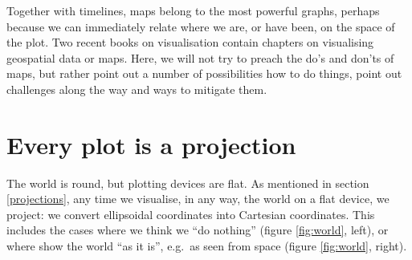 \documentclass[]{book}
\begin{document}
Together with timelines, maps belong to the most powerful graphs,
perhaps because we can immediately relate where we are, or have
been, on the space of the plot. Two recent books on visualisation
\citep{Healy, Wilke} contain chapters on visualising geospatial data or
maps. Here, we will not try to preach the do's and don'ts of maps,
but rather point out a number of possibilities how to do things,
point out challenges along the way and ways to mitigate them.

\hypertarget{transform}{%
\section{Every plot is a projection}\label{transform}}

The world is round, but plotting devices are flat. As mentioned
in section \ref{projections}, any time we visualise, in any
way, the world on a flat device, we project: we convert ellipsoidal
coordinates into Cartesian coordinates. This includes the cases
where we think we ``do nothing'' (figure \ref{fig:world}, left),
or where show the world ``as it is'', e.g.~as seen from space (figure
\ref{fig:world}, right).
\end{document}
